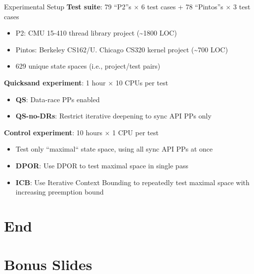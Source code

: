 \documentclass[xcolor=dvipsnames]{beamer}
\begin{document}
\begin{frame}{Experimental Setup}
	\textbf{Test suite}: 79 ``P2''s $\times$ 6 test cases + 78 ``Pintos''s $\times$ 3 test cases
	\begin{itemize}
		\item P2: CMU 15-410 thread library project (\textasciitilde{}1800 LOC)
		\item Pintos: Berkeley CS162/U. Chicago CS320 kernel project (\textasciitilde{}700 LOC)
		\item 629 unique state spaces (i.e., project/test pairs)
	\end{itemize}
	\pause
	\linegap

	{\bf Quicksand experiment}: 1 hour $\times$ 10 CPUs per test
	\begin{itemize}
		\item {\bf QS}: Data-race PPs enabled
		\item {\bf QS-no-DRs}: Restrict iterative deepening to sync API PPs only
	\end{itemize}
	\linegap

	{\bf Control experiment}: 10 hours $\times$ 1 CPU per test
	\begin{itemize}
		\item Test only ``maximal`` state space, using all sync API PPs at once
		\item {\bf DPOR}: Use DPOR to test maximal space in single pass
		\item {\bf ICB}: Use Iterative Context Bounding to repeatedly test maximal space with increasing preemption bound
	\end{itemize}
\end{frame}


\section{End}


\section{Bonus Slides}
\end{document}
